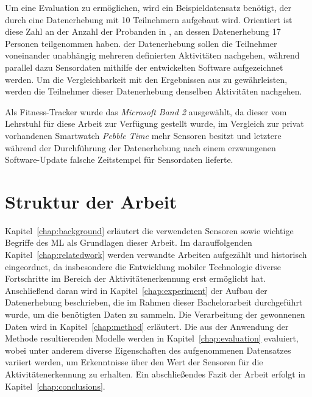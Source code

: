 Um eine Evaluation zu ermöglichen, wird ein Beispieldatensatz benötigt, der durch eine Datenerhebung mit 10 Teilnehmern aufgebaut wird. Orientiert ist diese Zahl an der Anzahl der Probanden in \cite{Weiss2016}, an dessen Datenerhebung 17 Personen teilgenommen haben. der Datenerhebung sollen die Teilnehmer voneinander unabhängig mehreren definierten Aktivitäten nachgehen, während parallel dazu Sensordaten mithilfe der entwickelten Software aufgezeichnet werden. Um die Vergleichbarkeit mit den Ergebnissen aus \cite{Weiss2016} zu gewährleisten, werden die Teilnehmer dieser Datenerhebung denselben Aktivitäten nachgehen.

Als Fitness-Tracker wurde das \textit{Microsoft Band 2} ausgewählt, da dieser vom Lehrstuhl für diese Arbeit zur Verfügung gestellt wurde, im Vergleich zur privat vorhandenen Smartwatch \textit{Pebble Time} mehr Sensoren besitzt und letztere während der Durchführung der Datenerhebung nach einem erzwungenen Software-Update falsche Zeitstempel für Sensordaten lieferte. 
\vspace{-0.25cm}
\section{Struktur der Arbeit}
Kapitel~\ref{chap:background} erläutert die verwendeten Sensoren sowie wichtige Begriffe des \acf{ML} als Grundlagen dieser Arbeit. Im darauffolgenden Kapitel~\ref{chap:relatedwork} werden verwandte Arbeiten aufgezählt und historisch eingeordnet, da insbesondere die Entwicklung mobiler Technologie diverse Fortschritte im Bereich der Aktivitätenerkennung erst ermöglicht hat. Anschließend daran wird in Kapitel~\ref{chap:experiment} der Aufbau der Datenerhebung beschrieben, die im Rahmen dieser Bachelorarbeit durchgeführt wurde, um die benötigten Daten zu sammeln. Die Verarbeitung der gewonnenen Daten wird in Kapitel~\ref{chap:method} erläutert. Die aus der Anwendung der Methode resultierenden Modelle werden in Kapitel~\ref{chap:evaluation} evaluiert, wobei unter anderem diverse Eigenschaften des aufgenommenen Datensatzes variiert werden, um Erkenntnisse über den Wert der Sensoren für die Aktivitätenerkennung zu erhalten. Ein abschließendes Fazit der Arbeit erfolgt in Kapitel~\ref{chap:conclusions}.

